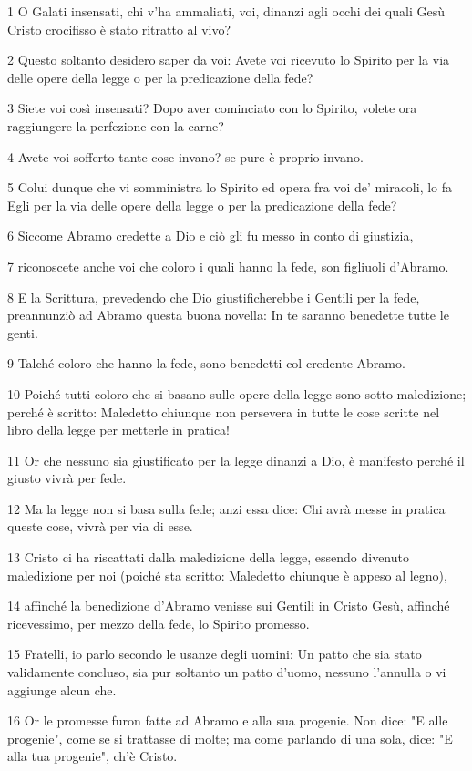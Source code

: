 \par 1 O Galati insensati, chi v'ha ammaliati, voi, dinanzi agli occhi dei quali Gesù Cristo crocifisso è stato ritratto al vivo?
\par 2 Questo soltanto desidero saper da voi: Avete voi ricevuto lo Spirito per la via delle opere della legge o per la predicazione della fede?
\par 3 Siete voi così insensati? Dopo aver cominciato con lo Spirito, volete ora raggiungere la perfezione con la carne?
\par 4 Avete voi sofferto tante cose invano? se pure è proprio invano.
\par 5 Colui dunque che vi somministra lo Spirito ed opera fra voi de' miracoli, lo fa Egli per la via delle opere della legge o per la predicazione della fede?
\par 6 Siccome Abramo credette a Dio e ciò gli fu messo in conto di giustizia,
\par 7 riconoscete anche voi che coloro i quali hanno la fede, son figliuoli d'Abramo.
\par 8 E la Scrittura, prevedendo che Dio giustificherebbe i Gentili per la fede, preannunziò ad Abramo questa buona novella: In te saranno benedette tutte le genti.
\par 9 Talché coloro che hanno la fede, sono benedetti col credente Abramo.
\par 10 Poiché tutti coloro che si basano sulle opere della legge sono sotto maledizione; perché è scritto: Maledetto chiunque non persevera in tutte le cose scritte nel libro della legge per metterle in pratica!
\par 11 Or che nessuno sia giustificato per la legge dinanzi a Dio, è manifesto perché il giusto vivrà per fede.
\par 12 Ma la legge non si basa sulla fede; anzi essa dice: Chi avrà messe in pratica queste cose, vivrà per via di esse.
\par 13 Cristo ci ha riscattati dalla maledizione della legge, essendo divenuto maledizione per noi (poiché sta scritto: Maledetto chiunque è appeso al legno),
\par 14 affinché la benedizione d'Abramo venisse sui Gentili in Cristo Gesù, affinché ricevessimo, per mezzo della fede, lo Spirito promesso.
\par 15 Fratelli, io parlo secondo le usanze degli uomini: Un patto che sia stato validamente concluso, sia pur soltanto un patto d'uomo, nessuno l'annulla o vi aggiunge alcun che.
\par 16 Or le promesse furon fatte ad Abramo e alla sua progenie. Non dice: "E alle progenie", come se si trattasse di molte; ma come parlando di una sola, dice: "E alla tua progenie", ch'è Cristo.

